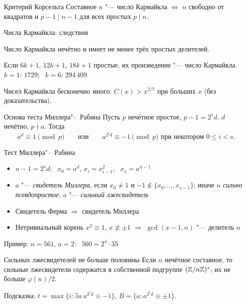 \documentclass{ca-slides}
\begin{document}
\begin{theoremframe}{Критерий Корсельта}
  Составное $n$ "--- число Кармайкла $\iff$ $n$ свободно от квадратов и $p - 1 \mid n - 1$
  для всех простых $p \mid n$.
\end{theoremframe}

\begin{canvasframe}{Числа Кармайкла: следствия}
  \small
  \begin{corollary}
    Число Кармайкла нечётно и имеет не менее трёх простых делителей.
  \end{corollary}
  \begin{proposition}[Чернек]
    Если $6k + 1$, $12k + 1$, $18k + 1$ простые, их произведение "--- число Кармайкла.
    \quad $k = 1$: $1729$; \ $k = 6$: $294\,409$.
  \end{proposition}
  \begin{theorem}
    Чисел Кармайкла бесконечно много: $C(x) > x^{2/7}$ при больших $x$ (без доказательства).
  \end{theorem}
\end{canvasframe}

\begin{theoremframe}{Основа теста Миллера"--~Рабина}
  Пусть $p$ нечётное простое, $p - 1 = 2^s d$, $d$ нечётно, $p \nmid a$. Тогда
  \[
    a^d \equiv 1 \pmod p \qquad\text{или}\qquad a^{2^i d} \equiv -1 \pmod p \text{ при некотором }
    0 \le i < s.
  \]
\end{theoremframe}

\begin{canvasframe}{Тест Миллера"--~Рабина}
  \begin{itemize}
    \item $n - 1 = 2^s d$; \ $x_0 = a^d$, $x_i = x_{i-1}^2$, \ $x_s = a^{n-1}$
    \item $a$ "--- \emph{свидетель Миллера}, если $x_0 \ne 1$ и $-1 \notin \{x_0, \ldots, x_{s-1}\}$;
      иначе $n$ \emph{сильно псевдопростое}, $a$ "--- \emph{сильный лжесвидетель}
    \item Свидетель Ферма $\Rightarrow$ свидетель Миллера
    \item Нетривиальный корень $x^2 \equiv 1$, $x \not\equiv \pm 1$ $\Rightarrow$
      $\gcd(x - 1, n)$ "--- делитель $n$
  \end{itemize}
  Пример: $n = 561$, $a = 2$: \ $560 = 2^4 \cdot 35$
  \penspace[0.25\textheight]
\end{canvasframe}

\begin{theoremframe}{Сильных лжесвидетелей не больше половины}
  Если $n$ нечётное составное, то сильные лжесвидетели содержатся в собственной подгруппе
  $(\mathbb{Z}/n\mathbb{Z})^{*}$; их не больше $\varphi(n)/2$.

  \smallskip\small Подсказка: $t = \max\{i : \exists a\ a^{2^i d} \equiv -1\}$,
  $B = \{a : a^{2^t d} \equiv \pm 1\}$.
\end{theoremframe}
\end{document}
